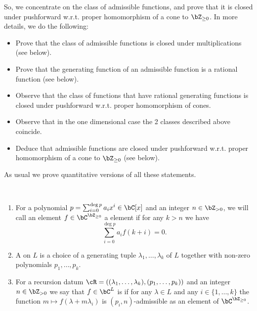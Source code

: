 \documentclass[12pt,a4paper]{amsart}%
\newcommand{\RamiB}[1]{{{#1}}}
\newcommand{\DimaA}[1]{{{#1}}}
\begin{document}
\RamiB{So, we concentrate on the class of admissible functions, and prove that it is closed under pushforward  w.r.t. proper homomorphism of a cone to $\Z_{\geq 0}$.}
\RamiB{In more details}, we do the following: 
\begin{itemize}
    \item Prove that \DimaA{the class of} admissible functions is closed under multiplications (see  below).
    \item Prove that the generating function of an admissible function is a rational function (see  below).
    \item Observe that the class of functions that have rational generating functions is closed under pushforward  w.r.t. proper homomorphism of cones.
    \item Observe that in the one dimensional case the 2 classes described above coincide.
    \item Deduce that admissible functions are closed under pushforward  w.r.t. proper homomorphism of a cone to $\Z_{\geq 0}$ (see  below).
\end{itemize}
 As usual we prove quantitative versions of all these statements.
 
\begin{definition}\label{def:adm}
$ $
\begin{enumerate}
    \item\label{def:adm:1} For a polynomial $p=\sum_{i=0}^{\deg p} a_ix^i \in \C[x]$ and an integer $n\in \Z_{>0}$, we will call an element $f\in \C^{\Z_{\geq 0}}$
    a  element if
for any $k>n$ we have $$\sum_{i=0}^{\deg p} a_i f(k+i)=0.$$
    \item A  on $L$ is a choice of a generating \RamiB{tuple} $\lambda_1,\dots,\lambda_k$ of $L$ together with non-zero polynomials $p_1,\dots,p_k$.
    \item  For a recursion datum $\cR=((\lambda_1,\dots,\lambda_k),(p_1,\dots,p_k))$ and an integer $n\in \Z_{>0}$ we say that $f\in \C^L$ is  if
     for any $\lambda\in L$ and any $i\in\{1,\dots,k\}$ the function $m\mapsto f(\lambda+m\lambda_i)$ is $(p_i,n)$-admissible as an element of  $\C^{\Z_{\geq 0}}$.
\end{enumerate}
    
\end{definition}
\end{document}
